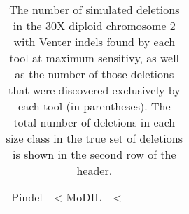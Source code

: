 \begin{table}[t]
\begin{center}
\begin{tabular}{rrr|rrrrr}
  Pindel           & <%
  MoDIL           & <%
   \hline
\end{tabular}
\end{center}
\caption{The number of simulated deletions in the 30X diploid chromosome 2 with Venter indels found by each tool at maximum sensitivy, as well as the number of those deletions that were discovered exclusively by each tool (in parentheses). The total number of deletions in each size class in the true set of deletions is shown in the second row of the header.}
\label{chr2DeletionPredsMaxSensitivity}
\end{table}
